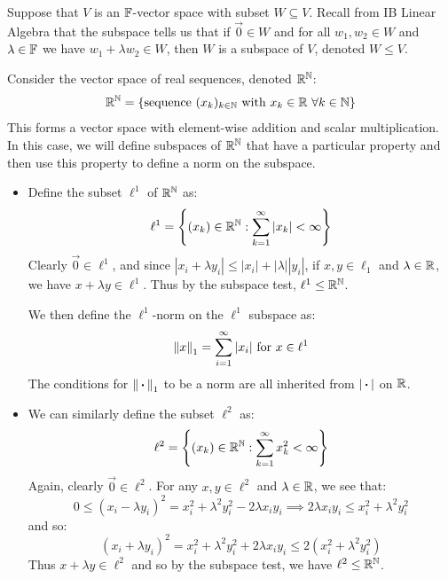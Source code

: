 \documentclass[../main.tex]{subfiles}
\begin{document}
\begin{remark}[Recap]
  Suppose that $V$ is an $\mathbb{F}$-vector space with subset $W \subseteq V$.
  Recall from IB Linear Algebra that the subspace tells us that if $\vec{0} \in W$ and for all $w_1, w_2 \in W$ and $\lambda \in \mathbb{F}$ we have $w_1 + \lambda w_2 \in W$, then $W$ is a subspace of $V$, denoted $W \leq V$.
\end{remark}
\begin{example} \label{infNorms}
  Consider the vector space of real sequences, denoted $\mathbb{R}^{\mathbb{N}}$:
  \[
    \mathbb{R}^{\mathbb{N}} = \{\text{sequence $(x_k)_{k \in \mathbb{N}}$ with $x_k \in \mathbb{R}\ \forall k \in \mathbb{N}$}\}
  \]
  This forms a vector space with element-wise addition and scalar multiplication.
  In this case, we will define subspaces of $\mathbb{R}^{\mathbb{N}}$ that have a particular property and then use this property to define a norm on the subspace.
  \begin{itemize}
    \item Define the subset $\ell^1$ of $\mathbb{R}^{\mathbb{N}}$ as:
      \[
        \ell^1 = \left\{(x_k) \in \mathbb{R}^{\mathbb{N}}: \sum_{k = 1}^{\infty} |x_k| < \infty\right\}
      \]
      Clearly $\vec{0} \in \ell^1$, and since $|x_i + \lambda y_i| \leq |x_i| + |\lambda| |y_i|$, if $x, y \in \ell_1$ and $\lambda \in \mathbb{R}$, we have $x + \lambda y \in \ell^1$.
      Thus by the subspace test, $\ell^1 \leq \mathbb{R}^{\mathbb{N}}$.

      We then define the $\ell^1$-norm on the $\ell^1$ subspace as:
      \[
        \left\lVert x \right\rVert_{1} = \sum_{i = 1}^{\infty} |x_i| \text{ for $x \in \ell^1$}
      \]
      The conditions for $\left\lVert {\hspace{0.18em}\boldsymbol{\cdot}\hspace{0.18em}} \right\rVert_1$ to be a norm are all inherited from $|{\hspace{0.18em}\boldsymbol{\cdot}\hspace{0.18em}}|$ on $\mathbb{R}$.
    \item We can similarly define the subset $\ell^2$ as:
      \[
        \ell^2 = \left\{(x_k) \in \mathbb{R}^{\mathbb{N}}: \sum_{k = 1}^{\infty} x_k^2 < \infty\right\}
      \]
      Again, clearly $\vec{0} \in \ell^2$.
      For any $x, y \in \ell^2$ and $\lambda \in \mathbb{R}$, we see that:
      \[
        0 \leq (x_i - \lambda y_i)^2 = x^2_i + \lambda^2 y^2_i - 2\lambda x_i y_i \implies 2 \lambda x_i y_i \leq x^2_i + \lambda^2 y^2_i
      \]
      and so:
      \[
        (x_i + \lambda y_i)^2 = x^2_i + \lambda^2 y^2_i + 2\lambda x_i y_i \leq 2(x^2_i + \lambda^2 y^2_i)
      \]
      Thus $x + \lambda y \in \ell^2$ and so by the subspace test, we have $\ell^2 \leq \mathbb{R}^{\mathbb{N}}$.


\end{itemize}
\end{example}
\end{document}
